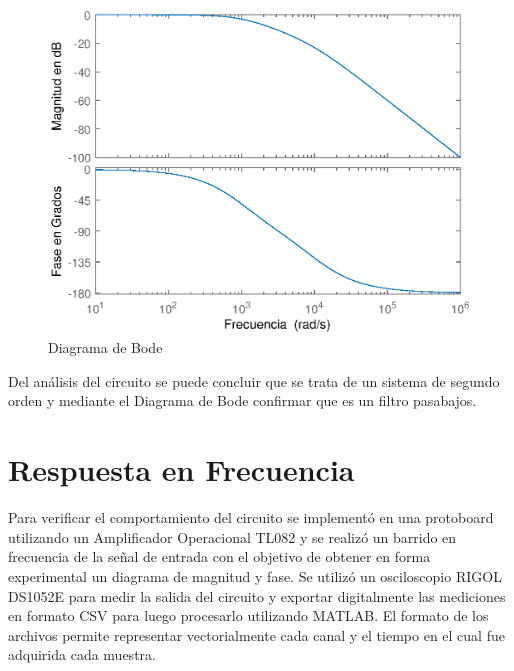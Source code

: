 \documentclass[10pt,a4paper]{article} %
\begin{document}
\begin{figure}[H]
\begin{center}
	\includegraphics[scale=0.6]{bode}
	\caption{Diagrama de Bode}
\end{center}
\end{figure}

Del análisis del circuito se puede concluir que se trata de un sistema de segundo orden y mediante el Diagrama de Bode confirmar que es un filtro pasabajos.

\section{Respuesta en Frecuencia}

Para verificar el comportamiento del circuito se implementó en una protoboard utilizando un Amplificador Operacional TL082 y se realizó un barrido en frecuencia de la señal de entrada con el objetivo de obtener en forma experimental un diagrama de magnitud y fase. Se utilizó un osciloscopio RIGOL DS1052E para medir la salida del circuito y exportar digitalmente las mediciones en formato CSV para luego procesarlo utilizando MATLAB. El formato de los archivos permite representar vectorialmente cada canal y el tiempo en el cual fue adquirida cada muestra.
\end{document}
